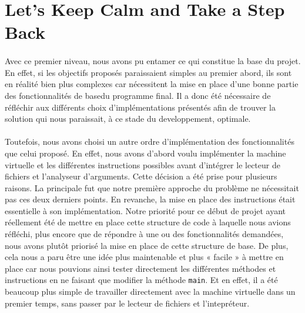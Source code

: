 \documentclass[a4paper]{article}
\begin{document}
\section{Let's Keep Calm and Take a Step Back}
\paragraph{}Avec ce premier niveau, nous avons pu entamer ce qui constitue la base du projet. En effet, si les objectifs proposés paraissaient simples au premier abord, ils sont en réalité bien plus complexes car nécessitent la mise en place d'une bonne partie des fonctionnalités de basedu programme final. Il a donc été nécessaire de réfléchir aux différents choix d'implémentations présentés afin de trouver la solution qui nous paraissait, à ce stade du developpement, optimale. 
\paragraph{}Toutefois, nous avons choisi un autre ordre d'implémentation des fonctionnalités que celui proposé. En effet, nous avons d'abord voulu implémenter la machine virtuelle et les différentes instructions possibles avant d'intégrer le lecteur de fichiers et l'analyseur d'arguments.
Cette décision a été prise pour plusieurs raisons. La principale fut que notre première approche du problème ne nécessitait pas ces deux derniers points. En revanche, la mise en place des instructions était essentielle à son implémentation. Notre priorité pour ce début de projet ayant réellement été de mettre en place cette structure de code à laquelle nous avions réfléchi, plus encore que de répondre à une ou des fonctionnalités demandées, nous avons plutôt priorisé la mise en place de cette structure de base.
De plus, cela nous a paru être une idée plus maintenable et plus « facile » à mettre en place car nous pouvions ainsi tester directement les différentes méthodes et instructions en ne faisant que modifier la méthode \texttt{main}. Et en effet, il a été beaucoup plus simple de travailler directement avec la machine virtuelle dans un premier temps, sans passer par le lecteur de fichiers et l'intepréteur.
\end{document}
